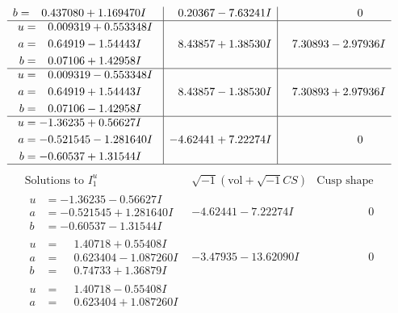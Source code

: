 \documentclass[1p]{elsarticle_modified}
\theoremstyle{definition}
\newcommand{\I}{\sqrt{-1}}
\begin{document}
$$\begin{array}{c|c|c}
\begin{aligned}
b &= \phantom{-}0.437080 + 1.169470 I\end{aligned}
 & \phantom{-}0.20367 - 7.63241 I & \phantom{-0.000000 } 0 \\ \hline\begin{aligned}
u &= \phantom{-}0.009319 + 0.553348 I \\
a &= \phantom{-}0.64919 - 1.54443 I \\
b &= \phantom{-}0.07106 + 1.42958 I\end{aligned}
 & \phantom{-}8.43857 + 1.38530 I & \phantom{-}7.30893 - 2.97936 I \\ \hline\begin{aligned}
u &= \phantom{-}0.009319 - 0.553348 I \\
a &= \phantom{-}0.64919 + 1.54443 I \\
b &= \phantom{-}0.07106 - 1.42958 I\end{aligned}
 & \phantom{-}8.43857 - 1.38530 I & \phantom{-}7.30893 + 2.97936 I \\ \hline\begin{aligned}
u &= -1.36235 + 0.56627 I \\
a &= -0.521545 - 1.281640 I \\
b &= -0.60537 + 1.31544 I\end{aligned}
 & -4.62441 + 7.22274 I & \phantom{-0.000000 } 0\\
 \hline 
 \end{array}$$\newpage$$\begin{array}{c|c|c}  
\text{Solutions to }I^u_{1}& \I (\text{vol} + \sqrt{-1}CS) & \text{Cusp shape}\\
 \hline 
\begin{aligned}
u &= -1.36235 - 0.56627 I \\
a &= -0.521545 + 1.281640 I \\
b &= -0.60537 - 1.31544 I\end{aligned}
 & -4.62441 - 7.22274 I & \phantom{-0.000000 } 0 \\ \hline\begin{aligned}
u &= \phantom{-}1.40718 + 0.55408 I \\
a &= \phantom{-}0.623404 - 1.087260 I \\
b &= \phantom{-}0.74733 + 1.36879 I\end{aligned}
 & -3.47935 - 13.62090 I & \phantom{-0.000000 } 0 \\ \hline\begin{aligned}
u &= \phantom{-}1.40718 - 0.55408 I \\
a &= \phantom{-}0.623404 + 1.087260 I \\

\end{aligned}
\end{array}$$
\end{document}
